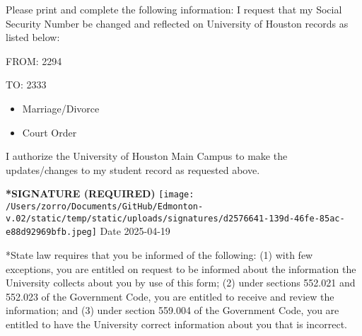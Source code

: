 \documentclass[12pt]{article}
\newcommand{\CheckedBox}[1]{%
  \ifthenelse{\equal{#1}{yes}}{$\boxtimes$}{$\square$}%
}
\begin{document}
\vspace{1em}
\noindent Please print and complete the following information: I request that my Social Security Number be changed and reflected on University of Houston records as listed below:

\vspace{0.5em}
\noindent FROM: 2294

\vspace{0.5em}
\noindent TO: 2333

\vspace{0.5em}
\begin{itemize}[leftmargin=0.7cm]
	\item \CheckedBox{no} Marriage/Divorce
	\item \CheckedBox{yes} Court Order
\end{itemize}

\vspace{1em}
\noindent I authorize the University of Houston Main Campus to make the updates/changes to my student record as requested above.

\vspace{1em}
\noindent\textbf{*SIGNATURE (REQUIRED)} \texttt{[image: /Users/zorro/Documents/GitHub/Edmonton-v.02/static/temp/static/uploads/signatures/d2576641-139d-46fe-85ac-e88d92969bfb.jpeg]} Date 2025-04-19

\vspace{1em}
\footnotesize{*State law requires that you be informed of the following: (1) with few exceptions, you are entitled on request to be informed about the information the University collects about you by use of this form; (2) under sections 552.021 and 552.023 of the Government Code, you are entitled to receive and review the information; and (3) under section 559.004 of the Government Code, you are entitled to have the University correct information about you that is incorrect.}
\end{document}
